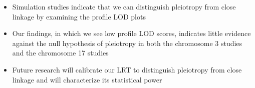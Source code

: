 \documentclass[a0,landscape]{a0poster}
\begin{document}
\begin{multicols}{4}

\begin{itemize}
\item Simulation studies indicate that we can distinguish pleiotropy from close linkage by examining the profile LOD plots
\item Our findings, in which we see low profile LOD scores, indicates little evidence against the null hypothesis of pleiotropy in both the chromosome 3 studies and the chromosome 17 studies
\item Future research will calibrate our LRT to distinguish pleiotropy from close linkage and will characterize its statistical power
\end{itemize}






\color{DarkSlateGray} %










\end{multicols}
\end{document}
